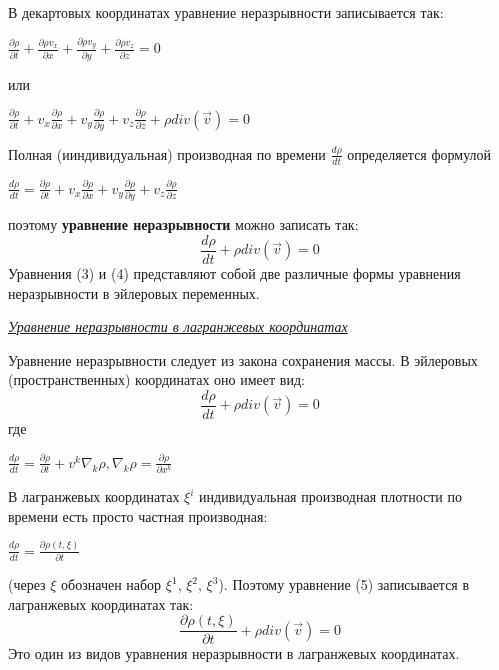 В декартовых координатах уравнение неразрывности записывается так:
\begin{center}$
    \frac{\partial \rho}{\partial t} + \frac{\partial \rho v_x}{\partial x} + \frac{\partial \rho v_y}{\partial y} + \frac{\partial \rho v_z}{\partial z} = 0
  $\end{center}
или
\begin{center}$
    \frac{\partial \rho}{\partial t} + v_x \frac{\partial \rho}{\partial x} + v_y \frac{\partial \rho}{\partial y} + v_z \frac{\partial \rho}{\partial z} + \rho div (\Vec{v}) = 0
  $\end{center}
Полная (ииндивидуальная) производная по времени $\frac{d \rho}{d t}$ определяется формулой
\begin{center}$
    \frac{d \rho}{d t} = \frac{\partial \rho}{\partial t} + v_x \frac{\partial \rho}{\partial x} + v_y \frac{\partial \rho}{\partial y} + v_z \frac{\partial \rho}{\partial z}
  $\end{center}
поэтому \textbf{уравнение неразрывности} можно записать так:
\begin{equation}
  \frac{d \rho}{d t} + \rho div(\Vec{v}) = 0
\end{equation}
Уравнения (3) и (4) представляют собой две различные формы уравнения неразрывности в эйлеровых переменных.

\begin{center}
  \textit{\underline{Уравнение неразрывности в лагранжевых координатах}}
\end{center}
Уравнение неразрывности следует из закона сохранения массы. В эйлеровых (пространственных) координатах оно имеет вид:
\begin{equation}
  \frac{d \rho}{d t} + \rho div(\Vec{v}) = 0
\end{equation}
где
\begin{center}$
    \frac{d \rho}{d t} = \frac{\partial \rho}{\partial t} + v^k \nabla_k \rho,
    \nabla_k \rho = \frac{\partial \rho}{\partial x^k}
  $\end{center}
В лагранжевых координатах $\xi^i$ индивидуальная производная плотности по времени есть просто частная производная:
\begin{center}$
    \frac{d \rho}{d t}  = \frac{\partial \rho (t, \xi)}{\partial t}
  $\end{center}
(через $\xi$ обозначен набор $\xi^1$, $\xi^2$, $\xi^3$). Поэтому уравнение (5) записывается в лагранжевых координатах так:
\begin{equation}
  \frac{\partial \rho (t, \xi)}{\partial t} + \rho div(\Vec{v}) = 0
\end{equation}
Это один из видов уравнения неразрывности в лагранжевых координатах.
